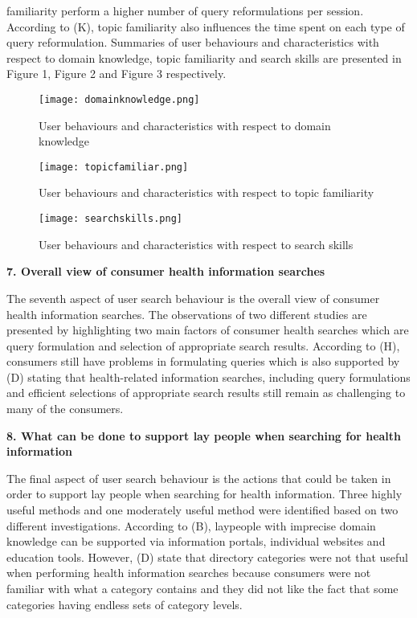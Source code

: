 \documentclass[]{article}
\begin{document}
familiarity perform a higher number of query reformulations per session. According to (K), topic familiarity also influences the time spent on each type of query reformulation. Summaries of user behaviours and characteristics with respect to domain knowledge, topic familiarity and search skills are presented in Figure 1, Figure 2 and Figure 3 respectively.   

\begin{figure}[t!]
	\texttt{[image: domainknowledge.png]}
	\caption{User behaviours and characteristics with respect to domain knowledge\label{fig1}}
\end{figure}  

\begin{figure}[t!]
	\texttt{[image: topicfamiliar.png]}
	\caption{User behaviours and characteristics with respect to topic familiarity\label{fig2}}
\end{figure} 

\begin{figure}[b!]
	\texttt{[image: searchskills.png]}
	\caption{User behaviours and characteristics with respect to search skills\label{fig3}}
\end{figure} 


\textbf{7. Overall view of consumer health information searches}


The seventh aspect of user search behaviour is the overall view of consumer health information searches. The observations of two different studies are presented by highlighting two main factors of consumer health searches which are query formulation and selection of appropriate search results. According to (H), consumers still have problems in formulating queries which is also supported by (D) stating that health-related information searches, including query formulations and efficient selections of appropriate search results still remain as challenging to many of the consumers.  

\textbf{8. What can be done to support lay people when searching for health information}

The final aspect of user search behaviour is the actions that could be taken in order to support lay people when searching for health information. Three highly useful methods and one moderately useful method were identified based on two different investigations. According to (B), laypeople with imprecise domain knowledge can be supported via information portals, individual websites and education tools. However, (D) state that directory categories were not that useful when performing health information searches because consumers were not familiar with what a category contains and they did not like the fact that some categories having endless sets of category levels. 
\end{document}
